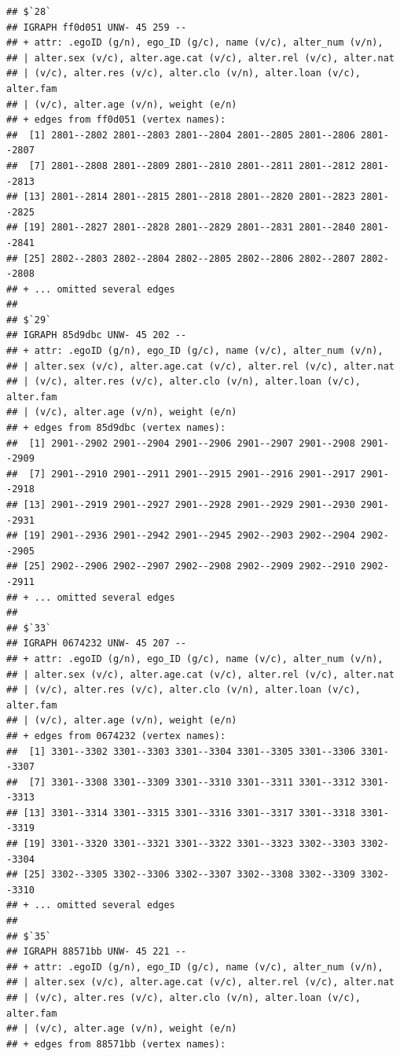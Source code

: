 \documentclass[
]{book}
\begin{document}
\begin{verbatim}
## $`28`
## IGRAPH ff0d051 UNW- 45 259 -- 
## + attr: .egoID (g/n), ego_ID (g/c), name (v/c), alter_num (v/n),
## | alter.sex (v/c), alter.age.cat (v/c), alter.rel (v/c), alter.nat
## | (v/c), alter.res (v/c), alter.clo (v/n), alter.loan (v/c), alter.fam
## | (v/c), alter.age (v/n), weight (e/n)
## + edges from ff0d051 (vertex names):
##  [1] 2801--2802 2801--2803 2801--2804 2801--2805 2801--2806 2801--2807
##  [7] 2801--2808 2801--2809 2801--2810 2801--2811 2801--2812 2801--2813
## [13] 2801--2814 2801--2815 2801--2818 2801--2820 2801--2823 2801--2825
## [19] 2801--2827 2801--2828 2801--2829 2801--2831 2801--2840 2801--2841
## [25] 2802--2803 2802--2804 2802--2805 2802--2806 2802--2807 2802--2808
## + ... omitted several edges
## 
## $`29`
## IGRAPH 85d9dbc UNW- 45 202 -- 
## + attr: .egoID (g/n), ego_ID (g/c), name (v/c), alter_num (v/n),
## | alter.sex (v/c), alter.age.cat (v/c), alter.rel (v/c), alter.nat
## | (v/c), alter.res (v/c), alter.clo (v/n), alter.loan (v/c), alter.fam
## | (v/c), alter.age (v/n), weight (e/n)
## + edges from 85d9dbc (vertex names):
##  [1] 2901--2902 2901--2904 2901--2906 2901--2907 2901--2908 2901--2909
##  [7] 2901--2910 2901--2911 2901--2915 2901--2916 2901--2917 2901--2918
## [13] 2901--2919 2901--2927 2901--2928 2901--2929 2901--2930 2901--2931
## [19] 2901--2936 2901--2942 2901--2945 2902--2903 2902--2904 2902--2905
## [25] 2902--2906 2902--2907 2902--2908 2902--2909 2902--2910 2902--2911
## + ... omitted several edges
## 
## $`33`
## IGRAPH 0674232 UNW- 45 207 -- 
## + attr: .egoID (g/n), ego_ID (g/c), name (v/c), alter_num (v/n),
## | alter.sex (v/c), alter.age.cat (v/c), alter.rel (v/c), alter.nat
## | (v/c), alter.res (v/c), alter.clo (v/n), alter.loan (v/c), alter.fam
## | (v/c), alter.age (v/n), weight (e/n)
## + edges from 0674232 (vertex names):
##  [1] 3301--3302 3301--3303 3301--3304 3301--3305 3301--3306 3301--3307
##  [7] 3301--3308 3301--3309 3301--3310 3301--3311 3301--3312 3301--3313
## [13] 3301--3314 3301--3315 3301--3316 3301--3317 3301--3318 3301--3319
## [19] 3301--3320 3301--3321 3301--3322 3301--3323 3302--3303 3302--3304
## [25] 3302--3305 3302--3306 3302--3307 3302--3308 3302--3309 3302--3310
## + ... omitted several edges
## 
## $`35`
## IGRAPH 88571bb UNW- 45 221 -- 
## + attr: .egoID (g/n), ego_ID (g/c), name (v/c), alter_num (v/n),
## | alter.sex (v/c), alter.age.cat (v/c), alter.rel (v/c), alter.nat
## | (v/c), alter.res (v/c), alter.clo (v/n), alter.loan (v/c), alter.fam
## | (v/c), alter.age (v/n), weight (e/n)
## + edges from 88571bb (vertex names):

\end{verbatim}
\end{document}
